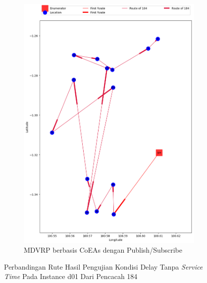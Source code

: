 \begin{figure}[H]\ContinuedFloat
	\centering
	\begin{subfigure}[t]{\textwidth}
		\centering
		\includegraphics[width=\textwidth]{Resources/Images/delayed_1/real_m15_n100_delayed_1_184_pubsub_coes}
		\caption{MDVRP berbasis CoEAs dengan Publish/Subscribe}
		\label{fig:real_m15_n100_delayed_1_184_pubsub_coes}
	\end{subfigure}
	\caption{Perbandingan Rute Hasil Pengujian Kondisi Delay Tanpa \textit{Service Time} Pada Instance d01 Dari Pencacah 184}
	\label{fig:real_m15_n100_delayed_1_184_contd}
\end{figure}


